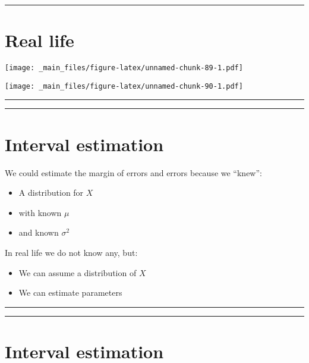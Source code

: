 \documentclass[
]{book}
\providecommand{\tightlist}{%
  \setlength{\itemsep}{0pt}\setlength{\parskip}{0pt}}
\begin{document}
\begin{center}\rule{0.5\linewidth}{0.5pt}\end{center}

\hypertarget{real-life}{%
\section{Real life}\label{real-life}}

\texttt{[image: \_main\_files/figure-latex/unnamed-chunk-89-1.pdf]}

\texttt{[image: \_main\_files/figure-latex/unnamed-chunk-90-1.pdf]}

\begin{center}\rule{0.5\linewidth}{0.5pt}\end{center}

\begin{center}\rule{0.5\linewidth}{0.5pt}\end{center}

\hypertarget{interval-estimation-1}{%
\section{Interval estimation}\label{interval-estimation-1}}

We could estimate the margin of errors and errors because we ``knew'':

\begin{itemize}
\tightlist
\item
  A distribution for \(X\)
\item
  with known \(\mu\)
\item
  and known \(\sigma^2\)
\end{itemize}

In real life we do not know any, but:

\begin{itemize}
\tightlist
\item
  We can assume a distribution of \(X\)
\item
  We can estimate parameters
\end{itemize}

\begin{center}\rule{0.5\linewidth}{0.5pt}\end{center}

\begin{center}\rule{0.5\linewidth}{0.5pt}\end{center}

\hypertarget{interval-estimation-2}{%
\section{Interval estimation}\label{interval-estimation-2}}
\end{document}
